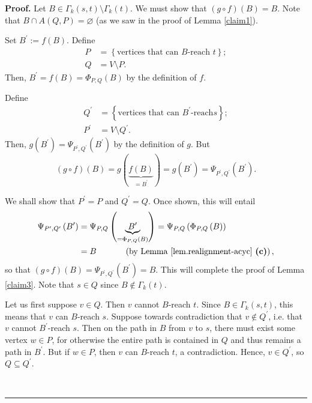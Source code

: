 \documentclass[numbers=enddot,12pt,final,onecolumn,notitlepage]{scrartcl}%
\theoremstyle{definition}
\newenvironment{proof}[1][Proof]{\noindent\textbf{#1.} }{\ \rule{0.5em}{0.5em}}
\theoremstyle{plainsl}
\begin{document}
\begin{proof}
Let $B\in\Gamma_{k}\left(  s,t\right)  \setminus\Gamma_{k}\left(  t\right)  $.
We must show that $\left(  g\circ f\right)  \left(  B\right)  =B$. Note that
$B\cap A\left(  Q,P\right)  =\varnothing$ (as we saw in the proof of Lemma
\ref{claim1}).

Set $B^{\prime}:=f\left(  B\right)  $. Define
\begin{align*}
P  &  =\left\{  \text{vertices that can }B\text{-reach }t\right\}  ;\\
Q  &  =V\setminus P.
\end{align*}
Then, $B^{\prime}=f\left(  B\right)  =\Phi_{P,Q}\left(  B\right)  $ by the
definition of $f$.

Define
\begin{align*}
Q^{\prime}  &  =\left\{  \text{vertices that can }B^{\prime}\text{-reach
}s\right\}  ;\\
P^{\prime}  &  =V\setminus Q^{\prime}.
\end{align*}
Then, $g\left(  B^{\prime}\right)  =\Psi_{P^{\prime},Q^{\prime}}\left(
B^{\prime}\right)  $ by the definition of $g$. But
\[
\left(  g\circ f\right)  \left(  B\right)  =g\left(  \underbrace{f\left(
B\right)  }_{=B^{\prime}}\right)  =g\left(  B^{\prime}\right)  =\Psi
_{P^{\prime},Q^{\prime}}\left(  B^{\prime}\right)  .
\]


We shall show that $P^{\prime}=P$ and $Q^{\prime}=Q$. Once shown, this will
entail
\begin{align*}
\Psi_{P^{\prime},Q^{\prime}}\left(  B^{\prime}\right)   &  =\Psi_{P,Q}\left(
\underbrace{B^{\prime}}_{=\Phi_{P,Q}\left(  B\right)  }\right)  =\Psi
_{P,Q}\left(  \Phi_{P,Q}\left(  B\right)  \right) \\
&  =B\ \ \ \ \ \ \ \ \ \ \left(  \text{by Lemma \ref{lem.realignment-acyc}
\textbf{(c)}}\right)  ,
\end{align*}
so that $\left(  g\circ f\right)  \left(  B\right)  =\Psi_{P^{\prime
},Q^{\prime}}\left(  B^{\prime}\right)  =B$. This will complete the proof of
Lemma \ref{claim3}. Note that $s \in Q$ since $B \notin\Gamma_{k}(t)$.

Let us first suppose $v \in Q$. Then $v$ cannot $B$-reach $t$. Since $B
\in\Gamma_{k}(s,t)$, this means that $v$ can $B$-reach $s$. Suppose towards
contradiction that $v \notin Q^{\prime}$, i.e. that $v$ cannot $B^{\prime}%
$-reach $s$. Then on the path in $B$ from $v$ to $s$, there must exist some
vertex $w \in P$, for otherwise the entire path is contained in $Q$ and thus
remains a path in $B^{\prime}$. But if $w \in P$, then $v$ can $B$-reach $t$,
a contradiction. Hence, $v \in Q^{\prime}$, so $Q \subseteq Q^{\prime}$.


\end{proof}
\end{document}

